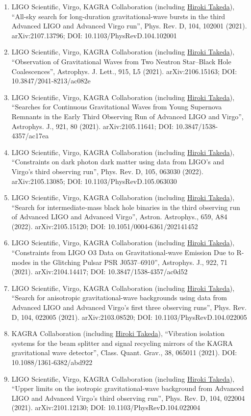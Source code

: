 \documentclass[uplatex, 11pt]{jsarticle}
\begin{document}
\begin{enumerate}
\item LIGO Scientific, Virgo, KAGRA Collaboration (including \uline{Hiroki Takeda}), “All-sky search for long-duration gravitational-wave bursts in the third Advanced LIGO and Advanced Virgo run”, Phys. Rev. D, 104, 102001 (2021). arXiv:2107.13796; DOI: 10.1103/PhysRevD.104.102001
\item LIGO Scientific, Virgo, KAGRA Collaboration (including \uline{Hiroki Takeda}), “Observation of Gravitational Waves from Two Neutron Star–Black Hole Coalescences”, Astrophys. J. Lett., 915, L5 (2021). arXiv:2106.15163; DOI: 10.3847/2041-8213/ac082e
\item LIGO Scientific, Virgo, KAGRA Collaboration (including \uline{Hiroki Takeda}), “Searches for Continuous Gravitational Waves from Young Supernova Remnants in the Early Third Observing Run of Advanced LIGO and Virgo”, Astrophys. J., 921, 80 (2021). arXiv:2105.11641; DOI: 10.3847/1538-4357/ac17ea
\item LIGO Scientific, Virgo, KAGRA Collaboration (including \uline{Hiroki Takeda}), “Constraints on dark photon dark matter using data from LIGO's and Virgo's third observing run”, Phys. Rev. D, 105, 063030 (2022). arXiv:2105.13085; DOI: 10.1103/PhysRevD.105.063030
\item LIGO Scientific, Virgo, KAGRA Collaboration (including \uline{Hiroki Takeda}), “Search for intermediate-mass black hole binaries in the third observing run of Advanced LIGO and Advanced Virgo”, Astron. Astrophys., 659, A84 (2022). arXiv:2105.15120; DOI: 10.1051/0004-6361/202141452
\item LIGO Scientific, Virgo, KAGRA Collaboration (including \uline{Hiroki Takeda}), “Constraints from LIGO O3 Data on Gravitational-wave Emission Due to R-modes in the Glitching Pulsar PSR J0537–6910”, Astrophys. J., 922, 71 (2021). arXiv:2104.14417; DOI: 10.3847/1538-4357/ac0d52
\item LIGO Scientific, Virgo, KAGRA Collaboration (including \uline{Hiroki Takeda}), “Search for anisotropic gravitational-wave backgrounds using data from Advanced LIGO and Advanced Virgo's first three observing runs”, Phys. Rev. D, 104, 022005 (2021). arXiv:2103.08520; DOI: 10.1103/PhysRevD.104.022005
\item KAGRA Collaboration (including \uline{Hiroki Takeda}), “Vibration isolation systems for the beam splitter and signal recycling mirrors of the KAGRA gravitational wave detector”, Class. Quant. Grav., 38, 065011 (2021). DOI: 10.1088/1361-6382/abd922
\item LIGO Scientific, Virgo, KAGRA Collaboration (including \uline{Hiroki Takeda}), “Upper limits on the isotropic gravitational-wave background from Advanced LIGO and Advanced Virgo's third observing run”, Phys. Rev. D, 104, 022004 (2021). arXiv:2101.12130; DOI: 10.1103/PhysRevD.104.022004

\end{enumerate}
\end{document}
